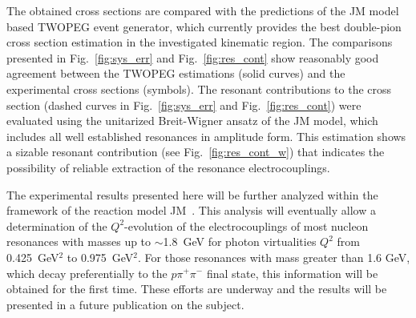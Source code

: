 \documentclass[prc,twocolumn,superscriptaddress,showpacs,amssymb,amsmath,amsfonts,aps,nofootinbib]{revtex4-1}
\begin{document}
The obtained cross sections are compared with the predictions of the JM model based TWOPEG event generator, which currently provides the best double-pion cross section estimation in the investigated kinematic region. 
The comparisons presented in Fig.~\ref{fig:sys_err} and Fig.~\ref{fig:res_cont} show reasonably good agreement between the TWOPEG estimations (solid curves) and the experimental cross sections (symbols). The resonant contributions  to the cross section (dashed curves in Fig.~\ref{fig:sys_err} and Fig.~\ref{fig:res_cont}) were evaluated using the unitarized Breit-Wigner ansatz of the JM model, which includes all well established resonances in amplitude form. This estimation shows a sizable resonant contribution (see Fig.~\ref{fig:res_cont_w}) that indicates the possibility of reliable extraction of the resonance electrocouplings.




The experimental results presented here will be further analyzed within the framework of the reaction model JM~\cite{Mokeev:2008iw,Mokeev:2012vsa,Mokeev:2015lda}. 
This analysis will eventually allow a determination of the $Q^2$-evolution of the electrocouplings of most nucleon resonances with masses up to $\sim$1.8~GeV for photon virtualities $Q^2$ from 0.425~GeV$^2$ to 0.975~GeV$^2$. For those resonances with mass greater than 1.6 GeV, which decay preferentially to the $p \pi^{+} \pi^{-}$ final state, this information will be obtained for the first time. These efforts are underway and the
results will be presented in a future publication on the subject.
\end{document}
